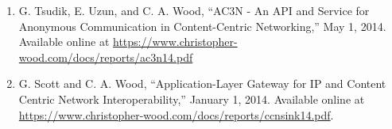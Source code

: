\documentclass[10pt]{res}
\begin{document}
\begin{resume}
\begin{enumerate}[TR-1.]
    \item G. Tsudik, E. Uzun, and C. A. Wood, ``AC3N - An API and Service for Anonymous Communication in Content-Centric Networking,'' May 1, 2014. Available online at \url{https://www.christopher-wood.com/docs/reports/ac3n14.pdf}
    \item G. Scott and C. A. Wood, ``Application-Layer Gateway for IP and Content Centric Network Interoperability,'' January 1, 2014. Available online at \url{https://www.christopher-wood.com/docs/reports/ccnsink14.pdf}.
\end{enumerate}













\end{resume}
\end{document}
